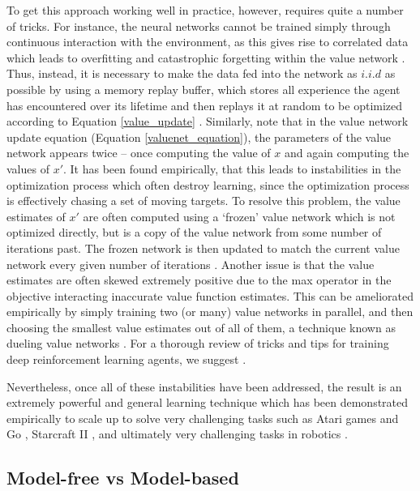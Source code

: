 To get this approach working well in practice, however, requires quite a number of tricks. For instance, the neural networks cannot be trained simply through continuous interaction with the environment, as this gives rise to correlated data which leads to overfitting and catastrophic forgetting within the value network \citep{mnih2013playing}. Thus, instead, it is necessary to make the data fed into the network as $i.i.d$ as possible by using a memory replay buffer, which stores all experience the agent has encountered over its lifetime and then replays it at random to be optimized according to Equation \ref{value_update} \citep{mnih2013playing}.  Similarly, note that in the value network update equation (Equation \ref{valuenet_equation}), the parameters of the value network appears twice -- once computing the value of $x$ and again computing the values of $x'$. It has been found empirically, that this leads to instabilities in the optimization process which often destroy learning, since the optimization process is effectively chasing a set of moving targets. To resolve this problem, the value estimates of $x'$ are often computed using a `frozen' value network which is not optimized directly, but is a copy of the value network from some number of iterations past. The frozen network is then updated to match the current value network every given number of iterations \citep{mnih2015human}. Another issue is that the value estimates are often skewed extremely positive due to the max operator in the objective interacting inaccurate value function estimates. This can be ameliorated empirically by simply training two (or many) value networks in parallel, and then choosing the smallest value estimates out of all of them, a technique known as dueling value networks \citep{wang2016dueling}. For a thorough review of tricks and tips for training deep reinforcement learning agents, we suggest \citet{fujimoto2018addressing,hessel2018rainbow}.

Nevertheless, once all of these instabilities have been addressed, the result is an extremely powerful and general learning technique which has been demonstrated empirically to scale up to solve very challenging tasks such as Atari games \citep{mnih2015human,mnih2014neural} and Go \citep{silver2016mastering,silver2017mastering}, Starcraft II \citep{vinyals2019grandmaster}, and ultimately very challenging tasks in robotics \citep{nagabandi_neural_2017,nagabandi2019deep,chua_deep_2018,williams2017model}. 

\subsection{Model-free vs Model-based}

